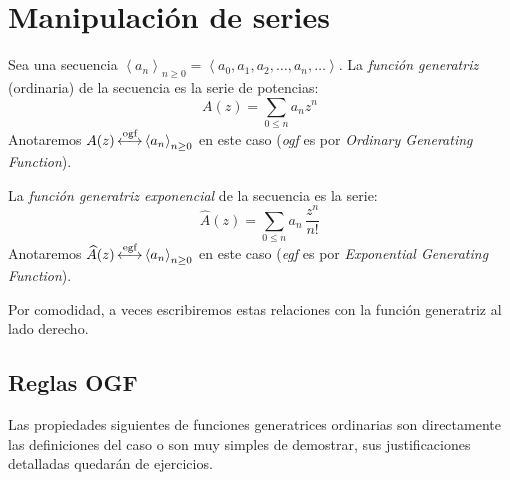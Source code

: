 \section{Manipulación de series}
\label{sec:manipulacion-series}

  Sea una secuencia
  \(\left\langle a_n \right\rangle_{n \ge 0}
     = \left\langle
	 a_0, a_1, a_2, \dotsc, a_n, \dotsc
       \right\rangle\).
  La \emph{función generatriz} (ordinaria) de la secuencia es
  la serie de potencias:%
  \begin{equation*}
    A(z)=\sum_{0 \le n} a_n z^n
  \end{equation*}
  Anotaremos
  \(A(z)
     \operatorname{\stackrel{\text{ogf}}{\longleftrightarrow}} \left\langle a_n\right\rangle_{n \ge 0}\) en este caso
  (\emph{ogf} es por
     \emph{\foreignlanguage{english}
			   {Ordinary Generating Function}}).

  La \emph{función generatriz exponencial}%
  de la secuencia es la serie:
  \begin{equation*}
    \widehat{A}(z)
      = \sum_{0 \le n} a_n \, \frac{z^n}{n!}
  \end{equation*}
  Anotaremos
  \(\widehat{A}(z)
     \operatorname{\stackrel{\text{egf}}{\longleftrightarrow}} \left\langle a_n\right\rangle_{n \ge 0}\) en este caso
  (\emph{egf} es por
     \emph{\foreignlanguage{english}
			   {Exponential Generating Function}}).

  Por comodidad,
  a veces escribiremos estas relaciones
  con la función generatriz al lado derecho.

\subsection{Reglas OGF}
\label{sec:reglas-OGF}

  Las propiedades siguientes de funciones generatrices ordinarias
  son directamente las definiciones del caso
  o son muy simples de demostrar,
  sus justificaciones detalladas quedarán de ejercicios.

